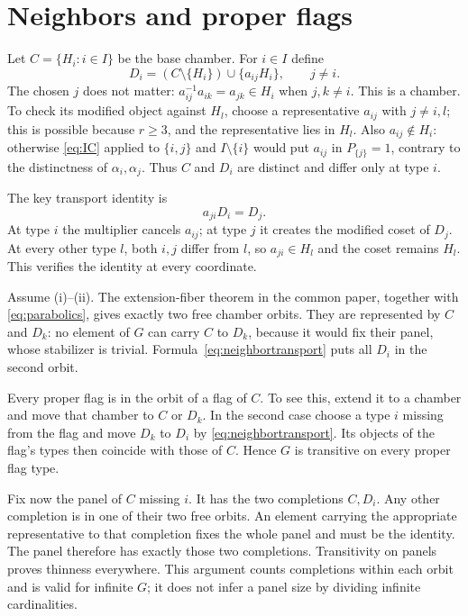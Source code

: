 \section{Neighbors and proper flags}
Let $C=\{H_i:i\in I\}$ be the base chamber. For $i\in I$ define
\begin{equation}\label{eq:neighbor}
 D_i=(C\setminus\{H_i\})\cup\{a_{ij}H_i\},\qquad j\ne i.
\end{equation}
The chosen $j$ does not matter: $a_{ij}^{-1}a_{ik}=a_{jk}\in H_i$ when $j,k\ne i$. This is a chamber. To check its modified object against $H_l$, choose a representative $a_{ij}$ with $j\ne i,l$; this is possible because $r\geq3$, and the representative lies in $H_l$. Also $a_{ij}\notin H_i$: otherwise \eqref{eq:IC} applied to $\{i,j\}$ and $I\setminus\{i\}$ would put $a_{ij}$ in $P_{\{j\}}=1$, contrary to the distinctness of $\alpha_i,\alpha_j$. Thus $C$ and $D_i$ are distinct and differ only at type $i$.

The key transport identity is
\begin{equation}\label{eq:neighbortransport}
                         a_{ji}D_i=D_j.
\end{equation}
At type $i$ the multiplier cancels $a_{ij}$; at type $j$ it creates the modified coset of $D_j$. At every other type $l$, both $i,j$ differ from $l$, so $a_{ji}\in H_l$ and the coset remains $H_l$. This verifies the identity at every coordinate.

Assume (i)--(ii). The extension-fiber theorem in the common paper, together with \eqref{eq:parabolics}, gives exactly two free chamber orbits. They are represented by $C$ and $D_k$: no element of $G$ can carry $C$ to $D_k$, because it would fix their panel, whose stabilizer is trivial. Formula~\eqref{eq:neighbortransport} puts all $D_i$ in the second orbit.

Every proper flag is in the orbit of a flag of $C$. To see this, extend it to a chamber and move that chamber to $C$ or $D_k$. In the second case choose a type $i$ missing from the flag and move $D_k$ to $D_i$ by \eqref{eq:neighbortransport}. Its objects of the flag's types then coincide with those of $C$. Hence $G$ is transitive on every proper flag type.

Fix now the panel of $C$ missing $i$. It has the two completions $C,D_i$. Any other completion is in one of their two free orbits. An element carrying the appropriate representative to that completion fixes the whole panel and must be the identity. The panel therefore has exactly those two completions. Transitivity on panels proves thinness everywhere. This argument counts completions within each orbit and is valid for infinite $G$; it does not infer a panel size by dividing infinite cardinalities.

